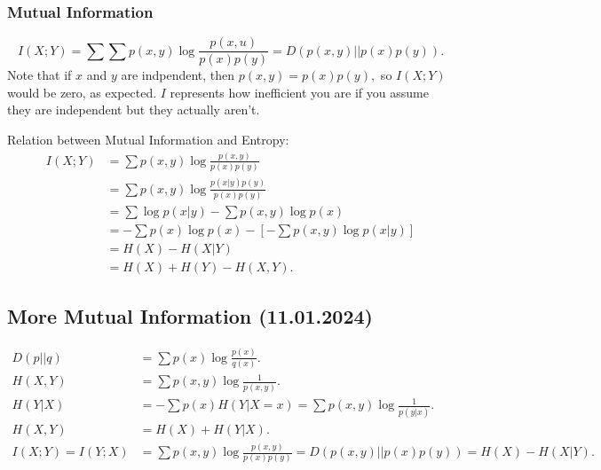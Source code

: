 \documentclass[12pt]{article}
\begin{document}
\subsubsection{Mutual Information}
\[I(X;Y)=\sum\sum p(x,y)\log\frac{p(x,u)}{p(x)p(y)}=D(p(x,y)||p(x)p(y)).\]
Note that if $x$ and $y$ are indpendent, then $p(x,y)=p(x)p(y),$ so $I(X;Y)$ would be zero, as expected. $I$ represents how inefficient you are if you assume they are independent but they actually aren't.

Relation between Mutual Information and Entropy:
\begin{align*}
I(X;Y)&=\sum p(x,y)\log\frac{p(x,y)}{p(x)p(y)} \\&=\sum p(x,y)\log\frac{p(x|y)p(y)}{p(x)p(y)}\\&=\sum\log p(x|y)-\sum p(x,y)\log p(x)\\&=-\sum p(x)\log p(x)-\left[-\sum p(x,y)\log p(x|y)\right]\\&=H(X)-H(X|Y)\\&=H(X)+H(Y)-H(X,Y).
\end{align*}

\subsection{More Mutual Information (11.01.2024)}
\begin{align*}
D(p||q)&=\sum p(x)\log\frac{p(x)}{q(x)}.
\\
H(X,Y)&=\sum p(x,y)\log\frac{1}{p(x,y)}.
\\
H(Y|X)&=-\sum p(x)H(Y|X=x)=\sum p(x,y)\log\frac{1}{p(y|x)}.
\\
H(X,Y)&=H(X)+H(Y|X).
\\
I(X;Y)=I(Y;X)&=\sum p(x,y)\log\frac{p(x,y)}{p(x)p(y)}=D(p(x,y)||p(x)p(y))=H(X)-H(X|Y).
\end{align*}
\end{document}
